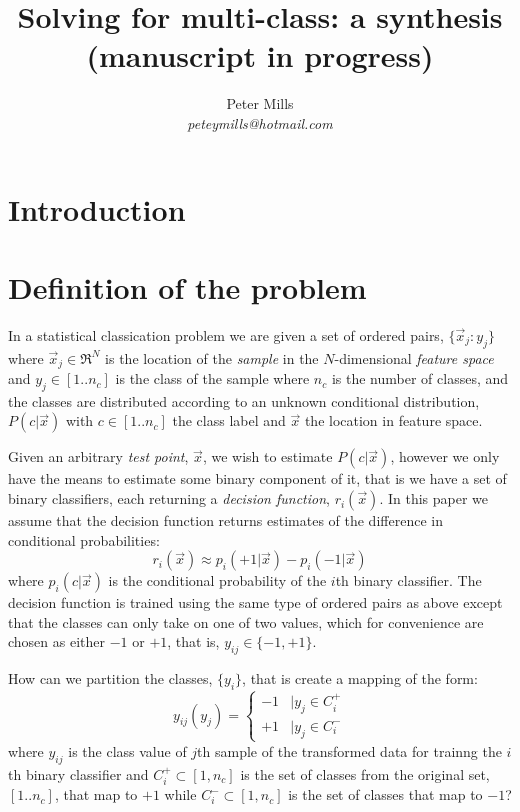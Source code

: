 \documentclass{article}
\begin{document}
\title{Solving for multi-class: a synthesis\\(manuscript in progress)}

\author{Peter Mills\\\textit{peteymills@hotmail.com}}

\maketitle

\section{Introduction}

\section{Definition of the problem}

\label{description}

In a statistical classication problem we are given a set of ordered pairs, 
$\lbrace \vec x_j : y_j \rbrace$ 
where $\vec x_j \in \Re^N$ is the location of the {\it sample} in 
the $N$-dimensional {\it feature space} 
and $y_j \in [1..n_c]$ is the class of the sample
where $n_c$ is the number of classes,
and the classes are
distributed according to an unknown conditional distribution,
$P(c | \vec x)$ with $c \in [1..n_c]$ the class label and $\vec x$ the location
in feature space.

Given an arbitrary {\it test point}, $\vec x$, 
we wish to estimate $P(c | \vec x)$, however we only have
the means to estimate some binary component of it, that is we have a 
set of binary classifiers, 
each returning a {\it decision function}, $r_i(\vec x)$.
In this paper we assume that the decision function 
returns estimates of the difference in conditional probabilities:
\begin{equation}
	r_i(\vec x) \approx p_i(+1|\vec x) - p_i(-1|\vec x)
\end{equation}
where $p_i(c|\vec x)$ is the conditional probability of the $i$th
binary classifier.
The decision function is trained using the same type of ordered pairs as
above except that the classes can only take on one of two values,
which for convenience are chosen as either $-1$ or $+1$, 
that is, $y_{ij} \in \lbrace -1, +1 \rbrace$.

How can we partition the classes, $\lbrace y_i \rbrace$, that is create
a mapping of the form:
\begin{equation}
	y_{ij} (y_j) = \left \lbrace  \begin{array}{lr}
-1 & | y_j \in C_i^+ \\
+1 & | y_j \in C_i^-
\end{array}
\right .
\end{equation}
where $y_{ij}$ is the class value of $j$th sample of the transformed data 
for trainng the $i$th binary classifier and 
$C_i^+ \subset [1,n_c]$ is the set of classes from the original set, 
$[1..n_c]$, that map to $+1$ while
$C_i^- \subset [1,n_c]$ is the set of classes that map to $-1$?
\end{document}
